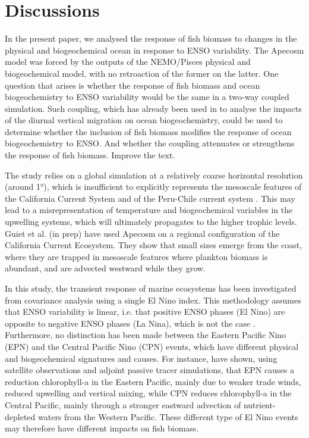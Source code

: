 \section{Discussions}

In the present paper, we analysed the response of fish biomass to changes in the physical and biogeochemical ocean in response to ENSO variability. The Apecosm model was forced by the outputs of the NEMO/Pisces physical and biogeochemical model, with no retroaction of the former on the latter. One question that arises is whether the response of fish biomass and ocean biogeochemistry to ENSO variability would be the same in a two-way coupled simulation. 	Such coupling, which has already been used in \cite{aumontEvaluatingPotentialImpacts2018} to analyse the impacts of the diurnal vertical migration on ocean biogeochemistry, could be used to determine whether the inclusion of fish biomass modifies the response of ocean biogeochemistry to ENSO. And whether the coupling attenuates or strengthens the response of fish biomass. Improve the text.
 
The study relies on a global simulation at a relatively coarse horizontal resolution (around 1°), which is insufficient to explicitly represents the mesoscale features of the California Current System \citep{capetMesoscaleSubmesoscaleTransition2008} and of the Peru-Chile current system \citep{colasHeatBalanceEddies2012}. This may lead to a misrepresentation of temperature and biogeochemical variables in the upwelling systems, which will ultimately propagates to the higher trophic levels. Guiet et al. (in prep) have used Apecosm on a regional configuration of the California Current Ecosystem. They show that small sizes emerge from the coast, where they are trapped in mesoscale features where plankton biomass is abundant, and are advected westward while they grow.

In this study, the transient response of marine ecosystems has been investigated from covariance analysis using a single El Nino index. This methodology assumes that ENSO variability is linear, i.e. that positive ENSO phases (El Nino) are opposite to negative ENSO phases (La Nina), which is not the case \citep{larkinENSOWarmNino2002}. Furthermore, no distinction has been made between the Eastern Pacific Nino (EPN) and the Central Pacific Nino (CPN) events, which have different physical and biogeochemical signatures and causes. For instance, \cite{gierachBiologicalResponse19972012} have shown, using satellite observations and adjoint passive tracer simulations, that EPN causes a reduction chlorophyll-a in the Eastern Pacific, mainly due to weaker trade winds, reduced upwelling and vertical mixing, while CPN reduces chlorophyll-a in the Central Pacific, mainly through a stronger eastward advection of nutrient-depleted waters from the Western Pacific. These different type of El Nino events may therefore have different impacts on fish biomass.


